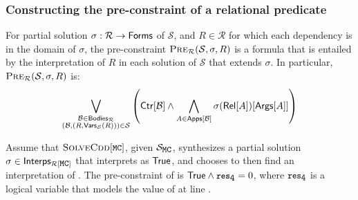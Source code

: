 \subsubsection{Constructing the pre-constraint of a relational predicate}
\label{sec:cons-pre}
%
For partial solution $\sigma : \mathcal{R} \to \mathsf{Forms}$ of
$\mathcal{S}$, and $R \in \mathcal{R}$ for which each dependency is in
the domain of $\sigma$, the pre-constraint $\textsc{Pre}_{ \mathcal{R}
}(\mathcal{S}, \sigma, R)$ is a formula that is entailed by the
interpretation of $R$ in each solution of $\mathcal{S}$ that extends
$\sigma$.
%
In particular, $\textsc{Pre}_{ \mathcal{R} }(\mathcal{S}, \sigma, R)$ is:
\[
\biglor_{ \substack{ \mathcal{B} \in \bodies{ \mathcal{R} } \\
  (\mathcal{B}, (R, \varsof{ \mathcal{S} }(R) ) ) \in \mathcal{S} } }
\left( \ctrof{ \mathcal{ B } } \land %
\bigland_{ A \in \appsof{ \mathcal{B} } } %
\sigma( \relof{A} )[ \argsof{ A } ] \right)
\]
%
\begin{ex}
  \label{ex:pre-ctr}
  Assume that $\mcsolve$, given $\mcchc$, synthesizes a partial
  solution $\sigma \in \interps{ \mcpreds }$ that interprets 
  as $\mathsf{True}$, and chooses to then find an interpretation of .
  The pre-constraint of  is $\true \land \cc{res}_{\cc{4}} =
  0$, where $\cc{res}_{\cc{4}}$ is a logical variable that models the
  value of  at line .
\end{ex}

